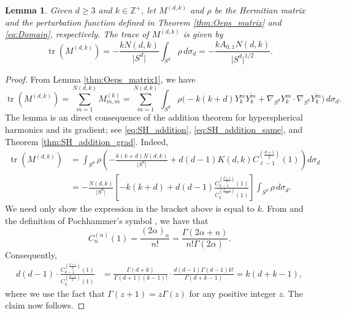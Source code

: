 \documentclass[11pt]{amsart}
\theoremstyle{definition}
\theoremstyle{plain}
\newtheorem{lemma}[definition]{Lemma}
\theoremstyle{remark}
\newcommand{\Z}{\mathbb{Z}}
\newcommand{\abs}[1]{\lvert{#1}\rvert}
\newcommand{\cc}{\overline}
\newcommand{\trace}[1]{\operatorname{tr}\left(#1\right)}
\begin{document}
\begin{lemma} \label{thm:Matrix_trace} 
Given $d\ge 3$ and $k\in\Z^+$, let $M^{(d, k)}$ and $\rho$ be the Hermitian matrix and the perturbation function defined in Theorem \ref{thm:Oeps_matrix} and \eqref{eq:Domain}, respectively. The trace of $M^{(d, k)}$ is given by 
\begin{equation*} 
\trace{M^{(d, k)}} = -\frac{k N(d, k)}{\abs{S^d}}\int_{S^d} \rho \, d\sigma_d = -\frac{kA_{0, 1}N(d, k)}{\abs{S^d}^{1/2}}. 
\end{equation*} 
\end{lemma} 
\begin{proof} 
From Lemma \eqref{thm:Oeps_matrix1}, we have 
\begin{equation*} 
\trace{M^{(d, k)}} = \sum_{m = 1}^{N(d, k)} M_{m ,m}^{(k)} = \sum_{m = 1}^{N(d, k)} \int_{S^d} \rho\Big(-k(k + d)Y_k^m\cc{Y_k^m} + \nabla_{S^d}Y_k^m\cdot\nabla_{S^d}\cc{Y_k^m}\Big)\, d\sigma_d. 
\end{equation*} 
The lemma is an direct consequence of the addition theorem for hyperspherical harmonics and its gradient; see \eqref{eq:SH_addition}, \eqref{eq:SH_addition_same}, and Theorem \ref{thm:SH_addition_grad}. Indeed, 
\begin{align*} 
\trace{M^{(d, k)}} & = \int_{S^d} \rho\left(-\frac{k(k + d)N(d, k)}{\abs{S^d}} + d(d - 1)K(d, k)C_{\ell - 1}^{\left(\frac{d + 1}{2}\right)}(1)\right) d\sigma_d \\ 
& = -\frac{N(d, k)}{\abs{S^d}}\left[-k(k + d) + d(d - 1)\frac{C_{k - 1}^{\left(\frac{d + 1}{2}\right)}(1)}{C_k^{\left(\frac{d - 1}{2}\right)}(1)}\right] \int_{S^d}\rho\, d\sigma_d. 
\end{align*}  
We need only show the expression in the bracket above is equal to $k$. From \cite[Table.~18.6.1]{NIST} and the definition of Pochhammer's symbol \cite[Eq.~5.2.5]{NIST}, we have that 
\begin{equation*} 
C_n^{(\alpha)}(1) = \frac{(2\alpha)_n}{n!} = \frac{\Gamma(2\alpha + n)}{n!\Gamma(2\alpha)}. 
\end{equation*} 
Consequently, 
\begin{align*} 
d(d - 1)\cdot \frac{C_{k - 1}^{\left(\frac{d + 1}{2}\right)}(1)}{C_k^{\left(\frac{d - 1}{2}\right)}(1)} & = \frac{\Gamma(d + k)}{\Gamma(d + 1)(k - 1)!}\cdot \frac{d(d - 1)\Gamma(d - 1)k!}{\Gamma(d + k - 1)} = k(d + k - 1),  
\end{align*} 
where we use the fact that $\Gamma(z + 1) = z\Gamma(z)$ for any positive integer $z$. The claim now follows. 
\end{proof} 
\end{document}
